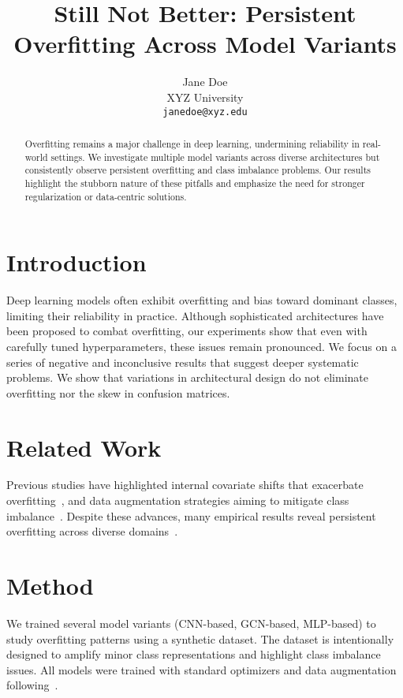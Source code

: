 \documentclass{article}
\title{Still Not Better: Persistent Overfitting Across Model Variants}
\author{Jane Doe \\
XYZ University \\
\texttt{janedoe@xyz.edu}
}
\begin{document}
\maketitle

\begin{abstract}
Overfitting remains a major challenge in deep learning, undermining reliability in real-world settings.
We investigate multiple model variants across diverse architectures but consistently observe persistent overfitting and class imbalance problems.
Our results highlight the stubborn nature of these pitfalls and emphasize the need for stronger regularization or data-centric solutions.
\end{abstract}

\section{Introduction}
Deep learning models often exhibit overfitting and bias toward dominant classes, limiting their reliability in practice.
Although sophisticated architectures have been proposed to combat overfitting, our experiments show that even with carefully tuned hyperparameters, these issues remain pronounced.
We focus on a series of negative and inconclusive results that suggest deeper systematic problems.
We show that variations in architectural design do not eliminate overfitting nor the skew in confusion matrices.

\section{Related Work}
Previous studies have highlighted internal covariate shifts that exacerbate overfitting~\cite{ioffe2015batch},
and data augmentation strategies aiming to mitigate class imbalance~\cite{perez2017effectiveness,shorten2019survey}.
Despite these advances, many empirical results reveal persistent overfitting across diverse domains~\cite{zhang2022understanding}.

\section{Method}
We trained several model variants (CNN-based, GCN-based, MLP-based) to study overfitting patterns using a synthetic dataset.
The dataset is intentionally designed to amplify minor class representations and highlight class imbalance issues.
All models were trained with standard optimizers and data augmentation following~\cite{perez2017effectiveness}.
\end{document}
